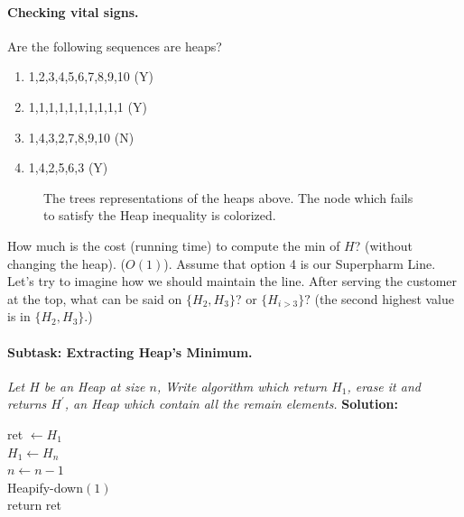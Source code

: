 
\paragraph{Checking vital signs.}Are the following sequences are heaps? 
\begin{enumerate}
  \item 1,2,3,4,5,6,7,8,9,10 (Y)
  \item 1,1,1,1,1,1,1,1,1,1  (Y)
  \item 1,4,3,2,7,8,9,10     (N)
  \item 1,4,2,5,6,3	     (Y)
\end{enumerate}
\begin{figure}[h]
  \centering
  \begin{subfigure}[b]{0.3\textwidth}
	
  \end{subfigure}
\begin{subfigure}[b]{0.3\textwidth}
	
  \end{subfigure}
\begin{subfigure}[b]{0.3\textwidth}
	
  \end{subfigure}
  \caption{The trees representations of the heaps above. The node which fails to satisfy the Heap inequality is colorized.}
\end{figure}
How much is the cost (running time) to compute the min of $H$? (without changing the heap). ($O\left( 1 \right)$). Assume that option 4 is our Superpharm Line. Let's try to imagine how we should maintain the line. After serving the customer at the top, what can be said on $ \{ H_{2}, H_{3}\}$? or $\{H_{i>3}\}?$ (the second highest value is in $\{H_{2}, H_{3} \}$.)   
\paragraph{Subtask: Extracting Heap's Minimum.} \textit{Let $H$ be an Heap at size $n$, Write algorithm which return $H_1$, erase it and returns $H^\prime$, an Heap which contain all the remain elements.} 
\textbf{Solution:} 


\begin{algorithm}[H]
ret $\leftarrow H_{1} $ \\
$ H_{1} \leftarrow H_{n} $  \\
$ n \leftarrow n -1 $ \\
Heapify-down$\left( 1 \right)$ \\
return ret  
\end{algorithm}





